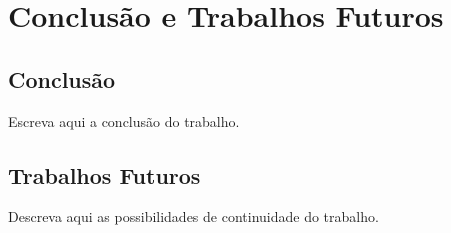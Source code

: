 \chapter{Conclusão e Trabalhos Futuros}\label{sec:conclusao}
\section{Conclusão}
Escreva aqui a conclusão do trabalho.

\section{Trabalhos Futuros}
Descreva aqui as possibilidades de continuidade do trabalho.
